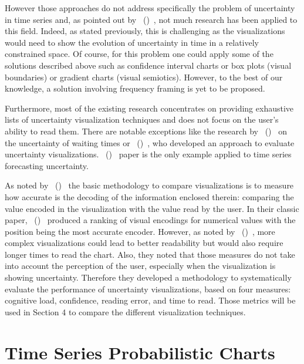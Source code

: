 \documentclass[a4paper,3p,sort&compress]{elsarticle}
\DeclareRobustCommand{\citeextp}[1]{\citeauthor{#1}~(\citeyear{#1})~\cite{#1}}
\begin{document}
However those approaches do not address specifically the problem of uncertainty
in time series and, as pointed out by 
\citeextp{leffrang_should_2021}, not much research has been applied to this field.
Indeed, as stated previously, this is challenging as the visualizations would
need to show the evolution of uncertainty in time in a relatively constrained
space. Of course, for this problem one could apply some of the solutions
described above such as confidence interval charts or box plots (visual
boundaries) or gradient charts (visual semiotics). However, to the best of our
knowledge, a solution involving frequency framing is yet to be proposed.

Furthermore, most of the existing research concentrates on providing exhaustive
lists of uncertainty visualization techniques and does not focus on the user's
ability to read them. There are notable exceptions like the research by 
\citeextp{2016-when-ish-is-my-bus} on the uncertainty of waiting times or
\citeextp{brennen_instrument_2018}, who developed an approach to
evaluate uncertainty visualizations. \citeextp{leffrang_should_2021}
paper is the only example applied to time series forecasting uncertainty.

As noted by \citeextp{cleveland_graphical_1984} the basic
methodology to compare visualizations is to measure how accurate is the decoding
of the information enclosed therein: comparing the value encoded in the
visualization with the value read by the user. In their classic paper, 
\citeextp{cleveland_graphical_1984} produced a ranking of visual encodings
for numerical values with the position being the most accurate encoder. However,
as noted by \citeextp{brennen_instrument_2018}, more complex
visualizations could lead to better readability but would also require longer
times to read the chart. Also, they noted that those measures do not take into
account the perception of the user, especially when the visualization is showing
uncertainty. Therefore they developed a methodology to systematically evaluate
the performance of uncertainty visualizations, based on four measures: cognitive
load, confidence, reading error, and time to read. Those metrics will be used in
Section 4 to compare the different visualization techniques.

\section{Time Series Probabilistic Charts}
\label{sec:time_series}
\end{document}
